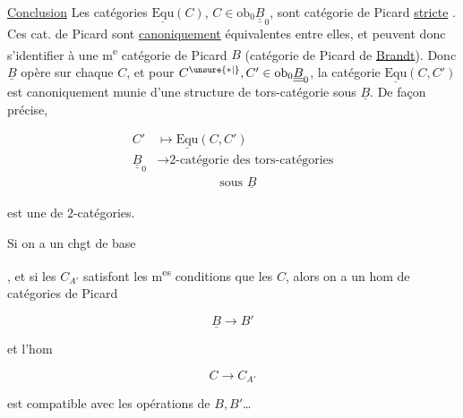 \uline{Conclusion} Les catégories $\underline{\mathrm{Equ}}(C)$, $C\in\mathrm{ob}_0\underline{\underline B}_0$, sont   catégorie de Picard \uline{stricte} .  Ces cat. de Picard sont \uline{canoniquement} équivalentes entre elles, et peuvent donc s'identifier à une m\textsuperscript{e} catégorie de Picard $B$ (catégorie de Picard de \uline{Brandt}). Donc $\underline B$ opère sur chaque $C$, et pour $C^{\unsure{*|{}}},C'\in\mathrm{ob}_0\underline{\underline B}_0$, la catégorie  $\underline{\mathrm{Equ}}(C,C')$ est canoniquement munie d'une structure de tors-catégorie sous $\underline B$. De façon précise,

\[
\begin{aligned}
C'&\longmapsto\underline{\mathrm{Equ}}(C,C')\\
\underline{\underline B}_0&\longrightarrow \text{2-catégorie des tors-catégories}\\
&\hspace{5em}\text{sous }\underline B
\end{aligned}
\]

est une  de $2$-catégories.

Si on a un chgt de base


, et si les $C_{A'}$ satisfont les m\textsuperscript{es} conditions que les $C$, alors on a un hom de  catégories de Picard

\[
\underline B\longrightarrow B'
\]

et l'hom 

\[
C\longrightarrow C_{A'}
\]

est compatible avec les opérations de $B,B'$\ldots

